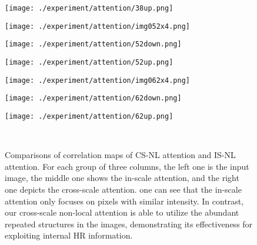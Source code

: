 \documentclass[10pt,twocolumn,letterpaper]{article}
\begin{document}
\begin{figure*}[t]
\begin{minipage}{0.105\textwidth}
    \texttt{[image: ./experiment/attention/38up.png]}
 \end{minipage}
 \begin{minipage}{0.105\textwidth}
    \texttt{[image: ./experiment/attention/img052x4.png]}
 \end{minipage}
 \begin{minipage}{0.105\textwidth}
    \texttt{[image: ./experiment/attention/52down.png]}
 \end{minipage}
 \begin{minipage}{0.105\textwidth}
    \texttt{[image: ./experiment/attention/52up.png]}
 \end{minipage}
 \begin{minipage}{0.105\textwidth}
    \texttt{[image: ./experiment/attention/img062x4.png]}
 \end{minipage}
 \begin{minipage}{0.105\textwidth}
    \texttt{[image: ./experiment/attention/62down.png]}
 \end{minipage}
 \begin{minipage}{0.105\textwidth}
    \texttt{[image: ./experiment/attention/62up.png]}
 \end{minipage}
 \\
 \centering
 \vspace{1.5mm}
\caption{Comparisons of correlation maps of CS-NL attention and IS-NL attention. For each group of three columns, the left one is the input image, the middle one shows the in-scale attention, and the right one depicts the cross-scale attention. one can see that the in-scale attention only focuses on pixels with similar intensity. In contrast, our cross-scale non-local attention is able to utilize the abundant repeated structures in the images, demonstrating its effectiveness for exploiting internal HR information. }
\label{fig:att}
\end{figure*}
\end{document}
